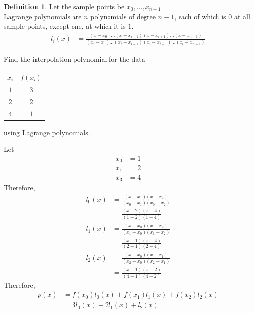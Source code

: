 \documentclass[fleqn, a4paper, 12pt, twoside]{article}
\theoremstyle{definition}
\newtheorem{definition}{Definition}
\theoremstyle{theorem}
\begin{document}
\begin{definition}
	Let the sample points be $x_0,\dots,x_{n - 1}$.\\
	Lagrange polynomials are $n$ polynomials of degree $n - 1$, each of which is $0$ at all sample points, except one, at which it is $1$.\\
	\begin{align*}
		l_i(x) &= \frac{(x - x_0) \dots (x - x_{i - 1}) (x - x_{i + 1}) \dots (x - x_{n - 1})}{(x_i - x_0) \dots (x_i - x_{i - 1}) (x_i - x_{i + 1}) \dots (x_i - x_{n - 1})}
	\end{align*}
\end{definition}

\begin{question}
	Find the interpolation polynomial for the data
	\begin{table}[H]
		\centering
		\begin{tabular}{c c}
			$x_i$ & $f(x_i)$\\
			$1$ & $3$\\
			$2$ & $2$\\
			$4$ & $1$\\
		\end{tabular}
	\end{table}
	using Lagrange polynomials.
\end{question}

\begin{solution}
	Let
	\begin{align*}
		x_0 &= 1\\
		x_1 &= 2\\
		x_3 &= 4
	\end{align*}
	Therefore,
	\begin{align*}
		l_0(x) &= \frac{(x - x_1) (x - x_2)}{(x_0 - x_1) (x_0 - x_2)}\\
		&= \frac{(x - 2) (x - 4)}{(1 - 2) (1 - 4)}\\
		l_1(x) &= \frac{(x - x_0) (x - x_2)}{(x_1 - x_0) (x_1 - x_2)}\\
		&= \frac{(x - 1) (x - 4)}{(2 - 1) (2 - 4)}\\
		l_2(x) &= \frac{(x - x_0) (x - x_1)}{(x_2 - x_0) (x_2 - x_1)}\\
		&= \frac{(x - 1) (x - 2)}{(4 - 1) (4 - 2)}
	\end{align*}
	Therefore,
	\begin{align*}
		p(x) &= f(x_0) l_0(x) + f(x_1) l_1(x) + f(x_2) l_2(x)\\
		&= 3 l_0(x) + 2 l_1(x) + l_2(x)
	\end{align*}
\end{solution}
\end{document}
